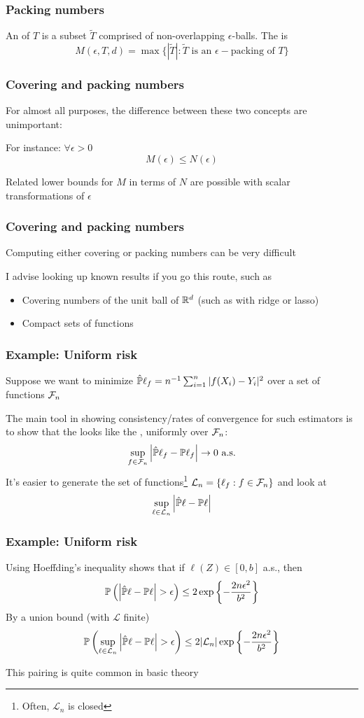 \documentclass[12pt]{beamer}
\begin{document}
\begin{frame}[fragile]
\frametitle{Packing numbers}
An  of $T$ is a subset $\tilde{T}$ comprised of non-overlapping $\epsilon$-balls.
The  is
\[
M(\epsilon,T,d) = \max\{ |\tilde{T}| : \tilde{T} \textrm{ is an } \epsilon-\textrm{packing of } T\}
\]
\end{frame}

\begin{frame}[fragile]
\frametitle{Covering and packing numbers}
For almost all purposes, the difference between these two concepts are unimportant:

\vsp
For instance: $\forall \epsilon > 0$
\[
M(\epsilon) \leq N(\epsilon)
\]

\vsp
Related lower bounds for $M$ in terms of $N$ are possible with scalar transformations of $\epsilon$
\end{frame}

\begin{frame}[fragile]
\frametitle{Covering and packing numbers}
Computing either covering or packing numbers can be very difficult

\vsp
I advise looking up known results if you go this route, such as
\begin{itemize}
\item Covering numbers of the unit ball of $\R^d$ (such as with ridge or lasso)
\item Compact sets of functions
\end{itemize}
\end{frame}



\begin{frame}[fragile]
\frametitle{Example: Uniform risk}
Suppose we want to minimize $\hat\P\ell_f = n^{-1} \sum_{i=1}^n |f(X_i) - Y_i|^2$ over a set of functions $\F_n$

\vsp
The main tool in showing consistency/rates of convergence for such estimators is to show
that the  looks like the , uniformly over $\F_n$:
\[
\sup_{f \in \F_n} \left| \hat\P\ell_f - \P\ell_f \right| \rightarrow 0 \textrm{ a.s.}
\]
It's easier to generate the set of functions\footnote{Often, $\mathcal{L}_n$ is closed} $\mathcal{L}_n =\{\ell_f : f\in \F_n\}$ and look at
\[
\sup_{\ell \in \mathcal{L}_n} \left| \hat\P\ell - \P\ell \right|
\]
\end{frame}

\begin{frame}[fragile]
\frametitle{Example: Uniform risk }
Using Hoeffding's inequality shows that if $\ell(Z) \in [0,b]$ a.s., then
\[
\P\left( \left|  \hat\P\ell - \P\ell \right| > \epsilon \right) \leq 2 \exp\left\{ -\frac{2n\epsilon^2}{b^2}\right\}
\]
By a union bound (with $\mathcal{L}$ finite)
\[
\P\left(\sup_{\ell \in \mathcal{L}_n} \left|  \hat\P\ell - \P\ell \right| > \epsilon \right) \leq 2 |\mathcal{L}_n| \exp\left\{ -\frac{2n\epsilon^2}{b^2}\right\}
\]

\vsp
This pairing is quite common in basic theory
\end{frame}
\end{document}
